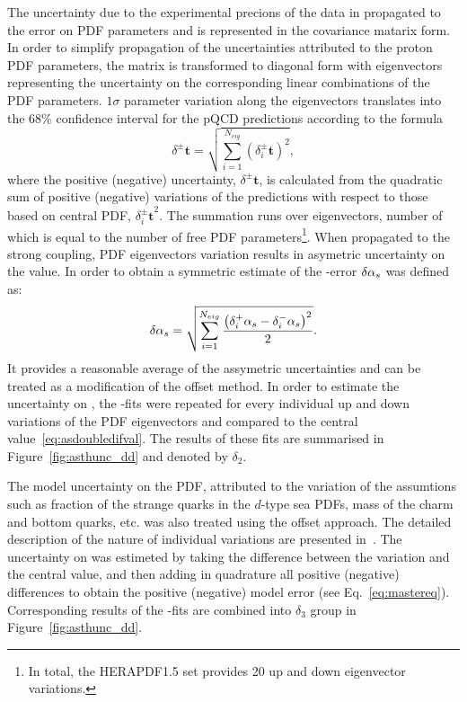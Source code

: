 The uncertainty due to the experimental precions of the data in propagated to the error on PDF parameters and is represented in the covariance matarix form. In order to simplify propagation of the uncertainties attributed to the proton PDF parameters, the matrix is transformed to diagonal form with eigenvectors representing the uncertainty on the corresponding linear combinations of the PDF parameters. $1\sigma$ parameter variation along the eigenvectors translates into the 68\% confidence interval for the pQCD predictions according to the formula~\cite{Campbell:2006wx}
\begin{equation}
 \delta^{\pm}\mathbf{t} = \sqrt{\sum_{i=1}^{N_{eig}}{\left(\mbox{$\delta_i^{\pm}\mathbf{t}$}\right)^2}},
 \label{eq:mastereq}
\end{equation}
where the positive (negative) uncertainty, $\delta^{\pm}\mathbf{t}$, is calculated from the quadratic sum of positive (negative) variations of the predictions with respect to those based on central PDF, $\mbox{$\delta_i^{\pm}\mathbf{t}$}^2$. The summation runs over eigenvectors, number of which is equal to the number of free PDF parameters\footnote{In total, the HERAPDF1.5 set provides 20 up and down eigenvector variations.}. When propagated to the strong coupling, PDF eigenvectors variation results in asymetric uncertainty on the \as value. In order to obtain a symmetric estimate of the \as-error $\delta\mbox{$\alpha_{s}$}$ was defined as:
\begin{equation}
 \delta\mbox{$\alpha_{s}$} = \sqrt{\sum_{i=1}^{N_{eig}}{\frac{\left(\mbox{$\delta_i^{+}\mbox{$\alpha_{s}$}$} - \mbox{$\delta_i^{-}\mbox{$\alpha_{s}$}$}\right)^2}{2}}}.
 \label{eq:mastereqsym}
\end{equation}
It provides a reasonable average of the assymetric uncertainties and can be treated as a modification of the offset method. In order to estimate the uncertainty on \asz, the \as-fits were repeated for every individual up and down variations of the PDF eigenvectors and compared to the central value~\ref{eq:asdoubledifval}. The results of these fits are summarised in Figure~\ref{fig:asthunc_dd} and denoted by $\delta_2$.
 
The model uncertainty on the PDF, attributed to the variation of the assumtions such as fraction of the strange quarks in the $d$-type sea PDFs, mass of the charm and bottom quarks, etc. was also treated using the offset approach. The detailed description of the nature of individual variations are presented in~\cite{herapdf1.5}. The uncertainty on \asz was estimeted  by taking the difference between the variation and the central value, and then adding in quadrature all positive (negative) differences to obtain the positive (negative) model error (see Eq.~\eqref{eq:mastereq}). Corresponding results of the \as-fits are combined into $\delta_3$ group in Figure~\ref{fig:asthunc_dd}. 

